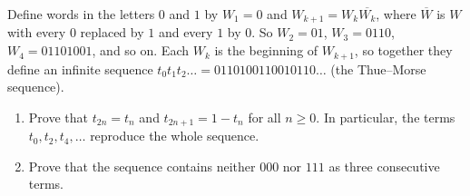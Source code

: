 Define words in the letters $0$ and $1$ by $W_1=0$ and $W_{k+1}=W_k\overline{W_k}$, where $\overline{W}$ is $W$ with every $0$ replaced by $1$ and every $1$ by $0$. So $W_2=01$, $W_3=0110$, $W_4=01101001$, and so on. Each $W_k$ is the beginning of $W_{k+1}$, so together they define an infinite sequence $t_0t_1t_2\ldots=0110100110010110\ldots$ (the Thue--Morse sequence).
\begin{enumerate}
\item[(a)] Prove that $t_{2n}=t_n$ and $t_{2n+1}=1-t_n$ for all $n\ge0$. In particular, the terms $t_0,t_2,t_4,\dots$ reproduce the whole sequence.
\item[(b)] Prove that the sequence contains neither $000$ nor $111$ as three consecutive terms.
\end{enumerate}
